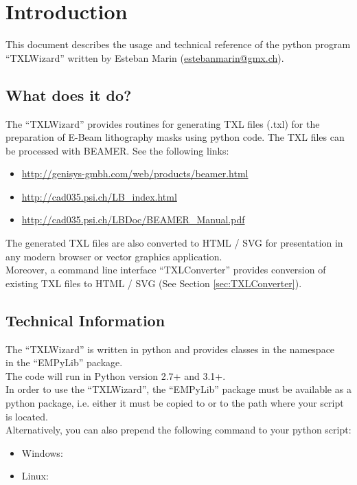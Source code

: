 \section{Introduction}
    This document describes the usage and technical reference of the python program ``TXLWizard''
    written by Esteban Marin (\href{mailto:estebanmarin@gmx.ch}{estebanmarin@gmx.ch}).\\

    \subsection{What does it do?}
        The ``TXLWizard'' provides routines for generating TXL files (.txl) for
        the preparation of E-Beam lithography masks using python code. The TXL files can be processed with BEAMER.
        See the following links:
        \begin{itemize}
            \item \url{http://genisys-gmbh.com/web/products/beamer.html}
            \item \url{http://cad035.psi.ch/LB_index.html}
            \item \url{http://cad035.psi.ch/LBDoc/BEAMER_Manual.pdf}
        \end{itemize}
        The generated TXL files are also converted to HTML / SVG for presentation in any modern browser or
        vector graphics application.\\
        Moreover, a command line interface ``TXLConverter'' provides conversion of existing TXL files to HTML / SVG
        (See Section \ref{sec:TXLConverter}).


    \subsection{Technical Information}
        The ``TXLWizard'' is written in python and provides classes in the
        namespace\\
         in the ``EMPyLib'' package.\\
        The code will run in Python version 2.7+ and 3.1+.\\
        In order to use the ``TXLWizard'', the ``EMPyLib'' package must be available as
        a python package, i.e. either it must be copied to  or
        to the path where your script is located. \\
        Alternatively, you can also prepend the following command to your python script:\\
        \begin{itemize}
            \item Windows: 
            \item Linux: 
        \end{itemize}


